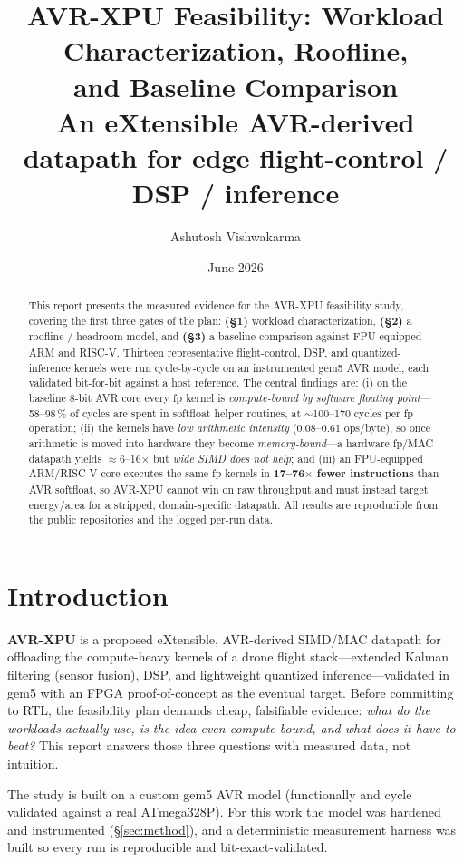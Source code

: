 \documentclass[11pt]{article}
\title{\textbf{AVR-XPU Feasibility: Workload Characterization, Roofline,\\ and Baseline Comparison}\\[2pt]
\large An eXtensible AVR-derived datapath for edge flight-control / DSP / inference}
\author{Ashutosh Vishwakarma}
\date{June 2026}
\begin{document}
\maketitle

\begin{abstract}
This report presents the measured evidence for the AVR-XPU feasibility study, covering the first three
gates of the plan: \textbf{(\S1)} workload characterization, \textbf{(\S2)} a roofline / headroom model,
and \textbf{(\S3)} a baseline comparison against FPU-equipped ARM and RISC-V. Thirteen representative
flight-control, DSP, and quantized-inference kernels were run cycle-by-cycle on an instrumented gem5 AVR
model, each validated bit-for-bit against a host reference. The central findings are: (i) on the baseline
8-bit AVR core every fp kernel is \emph{compute-bound by software floating point}---58--98\,\% of cycles
are spent in softfloat helper routines, at $\sim$100--170 cycles per fp operation; (ii) the kernels have
\emph{low arithmetic intensity} (0.08--0.61 ops/byte), so once arithmetic is moved into hardware they
become \emph{memory-bound}---a hardware fp/MAC datapath yields $\approx$6--16$\times$ but \emph{wide SIMD
does not help}; and (iii) an FPU-equipped ARM/RISC-V core executes the same fp kernels in
\textbf{17--76$\times$ fewer instructions} than AVR softfloat, so AVR-XPU cannot win on raw throughput and
must instead target energy/area for a stripped, domain-specific datapath. All results are reproducible
from the public repositories and the logged per-run data.
\end{abstract}

\section{Introduction}
\textbf{AVR-XPU} is a proposed eXtensible, AVR-derived SIMD/MAC datapath for offloading the compute-heavy
kernels of a drone flight stack---extended Kalman filtering (sensor fusion), DSP, and lightweight
quantized inference---validated in gem5 with an FPGA proof-of-concept as the eventual target. Before
committing to RTL, the feasibility plan demands cheap, falsifiable evidence: \emph{what do the workloads
actually use, is the idea even compute-bound, and what does it have to beat?} This report answers those
three questions with measured data, not intuition.

The study is built on a custom gem5 AVR model (functionally and cycle validated against a real
ATmega328P). For this work the model was hardened and instrumented (\S\ref{sec:method}), and a
deterministic measurement harness was built so every run is reproducible and bit-exact-validated.
\end{document}
